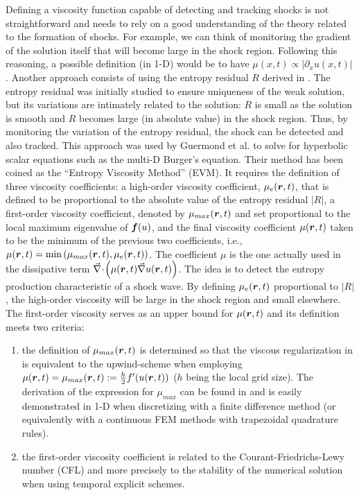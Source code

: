 Defining a viscosity function capable of detecting and tracking shocks is not straightforward and needs to rely on a good understanding of the theory related to the formation of shocks. For example, we can think of monitoring the gradient of the solution itself that will become large in the shock region. Following this reasoning, a possible definition (in 1-D) would be to have $\mu(x,t) \propto \left| \partial_x u(x,t) \right|$. Another approach consists of using the entropy residual $R$ derived in . The entropy residual was initially studied to ensure uniqueness of the weak solution, but its variations are intimately related to the solution: $R$ is small as the solution is smooth and $R$ becomes large (in absolute value) in the shock region. Thus, by monitoring the variation of the entropy residual, the shock can be detected and also tracked. This approach was used by Guermond et al. \cite{jlg1, jlg2, jlg3} to solve for hyperbolic scalar equations such as the multi-D Burger's equation. Their method has been coined as the ``Entropy Viscosity Method'' (EVM). It requires the definition of three viscosity coefficients: a high-order viscosity coefficient, $\mu_e(\boldsymbol r,t)$, that is defined to be proportional to the absolute value of the entropy residual $\left| R\right|$,  a first-order viscosity coefficient, denoted by $\mu_{max}(\boldsymbol r,t)$ and set proportional to the local maximum eigenvalue of $\boldsymbol f(u)$, and the final viscosity coefficient $\mu(\boldsymbol r,t)$ taken to be the minimum of the previous two coefficients, i.e., $\mu(\boldsymbol r,t) = \min \left( \mu_{max}(\boldsymbol r,t), \mu_e(\boldsymbol r,t) \right)$. The coefficient $\mu$ is the one actually used in the dissipative term $\vec{\nabla}\! \cdot \! \left( \mu(\boldsymbol r,t) \vec{\nabla} u(\boldsymbol r,t) \right)$. The idea is to detect the entropy production characteristic of a shock wave. By defining $\mu_e(\boldsymbol r,t)$ proportional to $\left| R \right|$, the high-order viscosity will be large in the shock region and small elsewhere. The first-order viscosity serves as an upper bound for $\mu(\boldsymbol r,t)$ and its definition meets two criteria:
\begin{enumerate}
\item the definition of $\mu_{max}(\boldsymbol r,t)$ is determined so that the viscous regularization in  is equivalent to the upwind-scheme when employing $\mu(\boldsymbol r,t) = \mu_{max}(\boldsymbol r,t) := \frac{h}{2} f'(u(\boldsymbol r,t))$ ($h$ being the local grid size). The derivation of the expression for $\mu_{max}$ can be found in \cite{REF2} and is easily demonstrated in 1-D when discretizing  with a finite difference method (or equivalently with a continuous FEM methods with trapezoidal quadrature rules). 
\item the first-order viscosity coefficient is related to the Courant-Friedrichs-Lewy number (CFL) and more precisely to the stability of the numerical solution when using temporal explicit schemes.
\end{enumerate}
